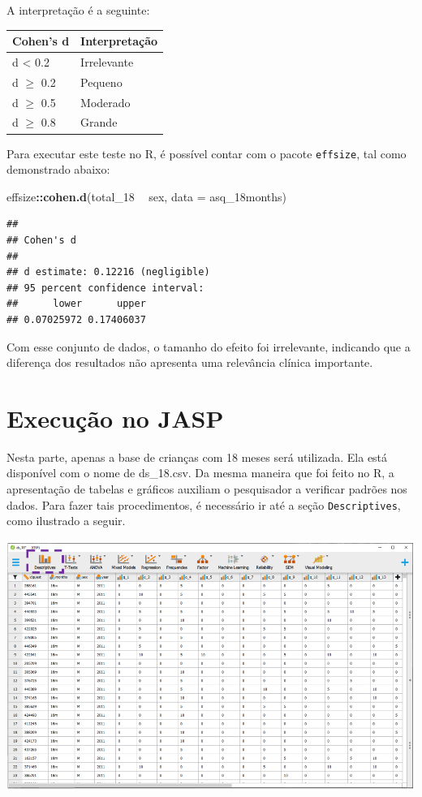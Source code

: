 \documentclass[
]{book}
\newenvironment{Shaded}{\begin{snugshade}}{\end{snugshade}}
\newcommand{\DataTypeTok}[1]{\textcolor[rgb]{0.13,0.29,0.53}{#1}}
\newcommand{\DecValTok}[1]{\textcolor[rgb]{0.00,0.00,0.81}{#1}}
\newcommand{\KeywordTok}[1]{\textcolor[rgb]{0.13,0.29,0.53}{\textbf{#1}}}
\newcommand{\NormalTok}[1]{#1}
\newcommand{\OperatorTok}[1]{\textcolor[rgb]{0.81,0.36,0.00}{\textbf{#1}}}
\newcommand{\StringTok}[1]{\textcolor[rgb]{0.31,0.60,0.02}{#1}}
\begin{document}
A interpretação é a seguinte:

\begin{longtable}[]{@{}ll@{}}
\toprule
Cohen's d & Interpretação\tabularnewline
\midrule
\endhead
d \textless{} 0.2 & Irrelevante\tabularnewline
d \(\geq\) 0.2 & Pequeno\tabularnewline
d \(\geq\) 0.5 & Moderado\tabularnewline
d \(\geq\) 0.8 & Grande\tabularnewline
\bottomrule
\end{longtable}

Para executar este teste no R, é possível contar com o pacote \texttt{effsize}, tal como demonstrado abaixo:

\begin{Shaded}
\begin{Highlighting}[]
\NormalTok{effsize}\OperatorTok{::}\KeywordTok{cohen.d}\NormalTok{(total_}\DecValTok{18} \OperatorTok{~}\StringTok{ }\NormalTok{sex, }\DataTypeTok{data =}\NormalTok{ asq_18months)}
\end{Highlighting}
\end{Shaded}

\begin{verbatim}
## 
## Cohen's d
## 
## d estimate: 0.12216 (negligible)
## 95 percent confidence interval:
##      lower      upper 
## 0.07025972 0.17406037
\end{verbatim}

Com esse conjunto de dados, o tamanho do efeito foi irrelevante, indicando que a diferença dos resultados não apresenta uma relevância clínica importante.

\hypertarget{execuuxe7uxe3o-no-jasp-3}{%
\section{Execução no JASP}\label{execuuxe7uxe3o-no-jasp-3}}

Nesta parte, apenas a base de crianças com 18 meses será utilizada. Ela está disponível com o nome de ds\_18.csv. Da mesma maneira que foi feito no R, a apresentação de tabelas e gráficos auxiliam o pesquisador a verificar padrões nos dados. Para fazer tais procedimentos, é necessário ir até a seção \texttt{Descriptives}, como ilustrado a seguir.

\includegraphics{./img/jasp_descriptives.png}
\end{document}
